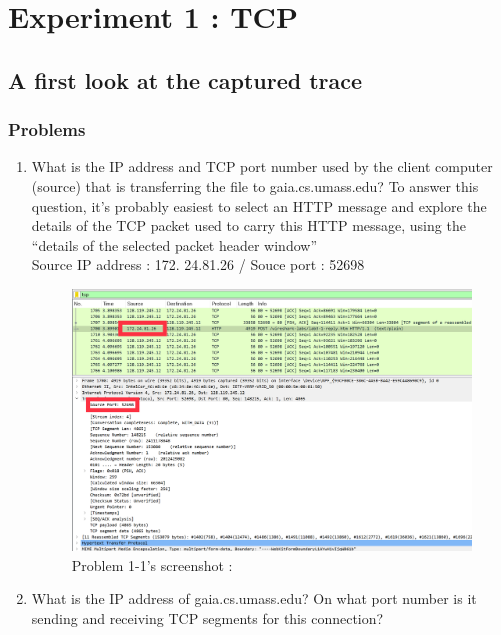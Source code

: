 \section{Experiment 1 : TCP}
\subsection{A first look at the captured trace}
    \subsubsection*{Problems}
    \begin{enumerate}[label=\bfseries Problem \arabic*:,leftmargin=*,labelindent=1em]
        \item What is the IP address and TCP port number used by the client computer (source) that is transferring the file to gaia.cs.umass.edu?
        To answer this question, it’s probably easiest to select an HTTP message and explore the details of the TCP packet used to carry this HTTP message, using the “details of the selected packet header window”\\[0.2mm]
        \soln Source IP address : 172. 24.81.26  /  Souce port : 52698
        \vspace{-4mm}  
        \begin{figure}[!h]\centering
    		\includegraphics[width=.85\textwidth]{image/week02/1-1-1.png}
    		\caption{\footnotesize Problem 1-1's screenshot : }
    		\vspace{-10pt}
        \end{figure}
        \item What is the IP address of gaia.cs.umass.edu? On what port number is it sending and receiving TCP segments for this connection?\\[0.2mm]
        \soln
    \end{enumerate}
\newpage